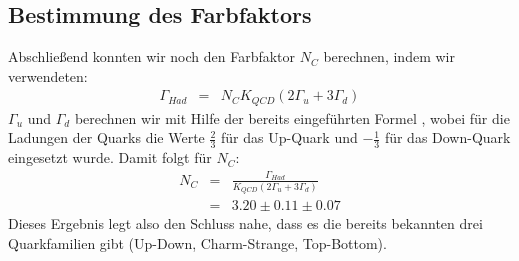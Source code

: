 \subsection{Bestimmung des Farbfaktors}
Abschließend konnten wir noch den Farbfaktor $N_C$ berechnen, indem wir \cite[Gl.15]{script} verwendeten:
\begin{eqnarray}
\Gamma_{Had} &=& N_CK_{QCD}(2\Gamma_u + 3\Gamma_d)
\end{eqnarray}
$\Gamma_u$ und $\Gamma_d$ berechnen wir mit Hilfe der bereits eingeführten Formel \cite[Gl.6]{script}, wobei für die Ladungen der Quarks die Werte $\frac{2}{3}$ für das Up-Quark und $-\frac{1}{3}$ für das Down-Quark eingesetzt wurde. Damit folgt für $N_C$:
\begin{eqnarray}
N_C &=& \frac{\Gamma_{Had}}{K_{QCD}(2\Gamma_u + 3\Gamma_d)}\\
&=& 3.20 \pm 0.11 \pm 0.07
\end{eqnarray}
Dieses Ergebnis legt also den Schluss nahe, dass es die bereits bekannten drei Quarkfamilien gibt (Up-Down, Charm-Strange, Top-Bottom).